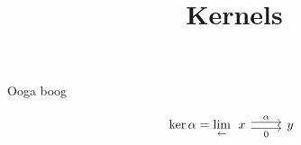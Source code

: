 \documentclass{atomic}
\title{Kernels}
\begin{document}
    \pagestyle{plain}  \noindent
    Ooga boog

    \[
        \ker{\alpha} =
        \lim_{\leftarrow}
        \begin{tikzcd}
        x \arrow[r, shift left, "\alpha"]
          \arrow[r, shift right, swap, "0"]
        & y
        \end{tikzcd}
    \]
\end{document}
